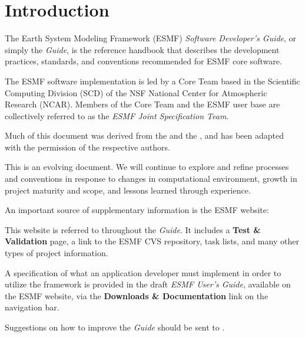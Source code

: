 
\section{Introduction}
\label{sec:intro}

The Earth System Modeling Framework (ESMF) {\it Software Developer's Guide},
or simply the {\it Guide}, is the reference handbook that describes
the development practices, standards, and conventions recommended 
for ESMF core software.

The ESMF software implementation is led by a Core Team based in the 
Scientific Computing Division (SCD) of the NSF National Center for
Atmospheric Research (NCAR).  Members of the Core Team and the ESMF
user base are collectively referred to as the {\it ESMF Joint
Specification Team}.

Much of this document was derived from the 
\cite{FMSdevguide} and the 
\cite{CCSMdevguide}, and has been adapted with the permission of the respective authors.

This is an evolving document.  We will continue to explore and refine
processes and conventions in response to changes in computational 
environment, growth in project maturity and scope, and lessons learned
through experience.

An important source of supplementary information is the ESMF website:
\begin{center}
\end{center}
This website is referred to throughout the {\it Guide}.  
It includes a {\bf Test \& Validation} page, a link to the ESMF
CVS repository, task lists, and many other types of project information.

A specification of what an application developer must implement in
order to utilize the framework is provided in the draft {\it ESMF
User's Guide}\cite{bib:ESMFusrdoc}, available on the ESMF website, 
via the {\bf Downloads \& Documentation} link on the navigation bar.

Suggestions on how to improve the {\it Guide} should be sent to 
.





















